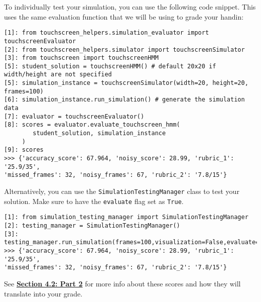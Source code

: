 \documentclass{article}
\begin{document}
    To individually test your simulation, you can use the following code snippet. This uses the same evaluation function that we will be using to grade your handin:
    \begin{verbatim}
[1]: from touchscreen_helpers.simulation_evaluator import touchscreenEvaluator
[2]: from touchscreen_helpers.simulator import touchscreenSimulator
[3]: from touchscreen import touchscreenHMM
[5]: student_solution = touchscreenHMM() # default 20x20 if width/height are not specified
[5]: simulation_instance = touchscreenSimulator(width=20, height=20, frames=100)
[6]: simulation_instance.run_simulation() # generate the simulation data
[7]: evaluator = touchscreenEvaluator()
[8]: scores = evaluator.evaluate_touchscreen_hmm(
        student_solution, simulation_instance
     )
[9]: scores
>>> {'accuracy_score': 67.964, 'noisy_score': 28.99, 'rubric_1': '25.9/35', 
'missed_frames': 32, 'noisy_frames': 67, 'rubric_2': '7.8/15'}
    \end{verbatim}
    
    Alternatively, you can use the \texttt{SimulationTestingManager} class to test your solution. Make sure to have the \texttt{evaluate} flag set as \texttt{True}.
    
    \begin{verbatim}
[1]: from simulation_testing_manager import SimulationTestingManager
[2]: testing_manager = SimulationTestingManager()
[3]: testing_manager.run_simulation(frames=100,visualization=False,evaluate=True,save=False)
>>> {'accuracy_score': 67.964, 'noisy_score': 28.99, 'rubric_1': '25.9/35', 
'missed_frames': 32, 'noisy_frames': 67, 'rubric_2': '7.8/15'}
    \end{verbatim}
    See \hyperref[subsec:part2grading]{\textbf{Section 4.2: Part 2}} for more info about these scores and how they will translate into your grade.
    
\end{document}
